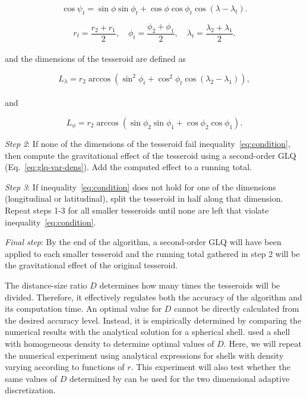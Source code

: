 \documentclass[extra, referee]{gji}
\begin{document}
\begin{equation}
    \cos\psi_t =
        \sin\phi\sin\phi_t + \cos\phi\cos\phi_t\cos(\lambda - \lambda_t).
\end{equation}

\begin{equation}
    r_t = \frac{r_2 + r_1}{2}, \quad
    \phi_t = \frac{\phi_2 + \phi_1}{2}, \quad
    \lambda_t = \frac{\lambda_2 + \lambda_1}{2}.
\end{equation}
\\
\noindent
and the dimensions of the tesseroid are defined as

\begin{equation}
    L_\lambda = r_2 \arccos(\sin^2\phi_t +
        \cos^2\phi_t\cos(\lambda_2 - \lambda_1)),
    \label{eq:sizelon}
\end{equation}
\\
\noindent and

\begin{equation}
    L_\phi = r_2 \arccos(\sin\phi_2\sin\phi_1 + \cos\phi_2\cos\phi_1).
\end{equation}

\textit{Step 2}:
If none of the dimensions of the tesseroid fail inequality~\ref{eq:condition}, then
compute the gravitational effect of the tesseroid using a second-order GLQ
(Eq.~\ref{eq:glq-var-dens}).
Add the computed effect to a running total.

\textit{Step 3}:
If inequality~\ref{eq:condition} does not hold for one of the dimensions
(longitudinal or latitudinal), split the tesseroid in half along that dimension.
Repeat steps 1-3 for all smaller tesseroids until none are left that violate
inequality~\ref{eq:condition}.

\textit{Final step}:
By the end of the algorithm, a second-order GLQ will have been applied to each smaller
tesseroid and the running total gathered in step 2 will be the gravitational effect of
the original tesseroid.

The distance-size ratio $D$ determines how many times the tesseroids will be divided.
Therefore, it effectively regulates both the accuracy of the algorithm and its
computation time.
An optimal value for $D$ cannot be directly calculated from the desired accuracy level.
Instead, it is empirically determined by comparing the numerical results with the
analytical solution for a spherical shell.
\citet{Uieda2016} used a shell with homogeneous density to determine optimal values of
$D$.
Here, we will repeat the numerical experiment using analytical expressions for shells
with density varying according to functions of $r$.
This experiment will also test whether the same values of $D$ determined by
\citet{Uieda2016} can be used for the two dimensional adaptive discretization.
\end{document}
